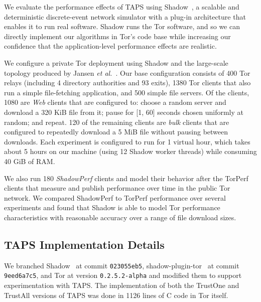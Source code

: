 \documentclass[conference]{styles/IEEEtran}
\newcommand{\etal}{\emph{et al.}}
\newcommand{\ps}{TAPS\xspace}
\begin{document}
We evaluate the performance effects of \ps using
Shadow~\cite{jansen2012shadow,shadowweb}, a scalable and deterministic
discrete-event network simulator with a plug-in architecture that enables it to
run real software. Shadow runs the Tor software, and so we
can directly implement our algorithms in Tor's code base while increasing our
confidence that the application-level performance effects are realistic.

We configure a private Tor deployment using Shadow and the large-scale
topology produced by Jansen \etal~\cite{jansen2014kist}. Our base configuration
consists of 400 Tor relays (including 4 directory authorities and 93 exits), 1380 Tor
clients that also run a simple file-fetching application, and 500 simple file
servers. Of the clients, 1080 are \emph{Web} clients that are configured to: choose a
random server and download a 320 KiB file from it; pause for [1, 60] seconds
chosen uniformly at random; and repeat. 120 of the remaining clients are \emph{bulk}
clients that are configured to repeatedly download a 5 MiB file without pausing
between downloads. Each experiment is configured to run for 1 virtual hour, which
takes about 5 hours on our machine (using 12 Shadow worker threads) while
consuming 40 GiB of RAM.

We also run 180 \emph{ShadowPerf} clients and model their behavior after the
TorPerf~\cite{torperf} clients that measure and publish performance over time in
the public Tor network. We compared ShadowPerf to TorPerf performance over several
experiments and found that Shadow is able to model Tor performance characteristics
with reasonable accuracy over a range of file download sizes.



\subsection{\ps Implementation Details}

We branched Shadow~\cite{shadowgit} at commit \texttt{023055eb5},
shadow-plugin-tor~\cite{shadowtorgit} at commit \texttt{9eed6a7c5}, and Tor at
version \texttt{0.2.5.2-alpha} and modified them to support experimentation with
\ps. The implementation of both the TrustOne and TrustAll 
versions of \ps was done in 1126 lines of C code in Tor itself.
\end{document}
